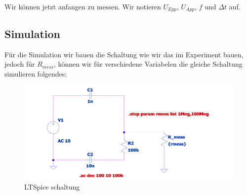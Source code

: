 Wir können jetzt anfangen zu messen. Wir notieren $U_{Epp}$, $U_{App}$, $f$ und $\Delta t$ auf.
%
%
%
\begin{flushright}
  \textit{\autorA}
\end{flushright}
%
%
%
%
\subsection{Simulation}
\label{subsec:3_Simulation}
%
%
Für die Simulation wir bauen die Schaltung wie wir das im Experiment bauen, jedoch für $R_{mess}$, können wir für verschiedene Variabelen die gleiche Schaltung simulieren folgendes:
\begin{figure}[H]
  \centering
  \includegraphics[scale=.4]{src/ltspice2.png}
  \caption{LTSpice schaltung}
  \label{fig:Schaltung von LTSpice}
\end{figure}
%
%
%
\begin{flushright}
  \textit{\autorA}
\end{flushright}
%
%
%
%